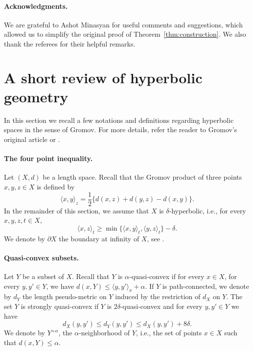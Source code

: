 \documentclass[11pt]{article}
\theoremstyle{definition}
\theoremstyle{remark}
\begin{document}
\paragraph*{Acknowledgments.}
We are grateful to Ashot Minasyan for useful comments and suggestions, which allowed us to simplify the original proof of Theorem~\ref{thm:construction}. We also thank the referees for their helpful remarks.

\section{A short review of hyperbolic geometry}
In this section we recall a few notations and definitions regarding hyperbolic spaces in the sense of Gromov. For more details, refer the reader to Gromov's original article \cite{ref11} or \cite{ref04,ref10}.

\paragraph*{The four point inequality.}
Let $(X,d)$ be a length space. Recall that the Gromov product of three points $x,y,z\in X$ is defined by
\[
\langle x,y\rangle_z=\frac12\{d(x,z)+d(y,z)-d(x,y)\}.
\]
In the remainder of this section, we assume that $X$ is $\delta$-hyperbolic, i.e., for every $x,y,z,t\in X$,
\begin{equation}\label{eq:fourpoint}
\langle x,z\rangle_t\geqslant\min\{\langle x,y\rangle_t,\langle y,z\rangle_t\}-\delta.
\end{equation}
We denote by $\partial X$ the boundary at infinity of $X$, see \cite[Chap.\,2]{ref04}.

\paragraph*{Quasi-convex subsets.}
Let $Y$ be a subset of $X$. Recall that $Y$ is $\alpha$-quasi-convex if for every $x\in X$, for every $y,y'\in Y$, we have $d(x,Y)\leqslant\langle y,y'\rangle_x+\alpha$. If $Y$ is path-connected, we denote by $d_Y$ the length pseudo-metric on $Y$ induced by the restriction of $d_X$ on $Y$. The set $Y$ is strongly quasi-convex if $Y$ is $2\delta$-quasi-convex and for every $y,y'\in Y$ we have
\[
d_X(y,y')\leqslant d_Y(y,y')\leqslant d_X(y,y')+8\delta.
\]
We denote by $Y^{+\alpha}$, the $\alpha$-neighborhood of $Y$, i.e., the set of points $x\in X$ such that $d(x,Y)\leqslant\alpha$.
\end{document}

